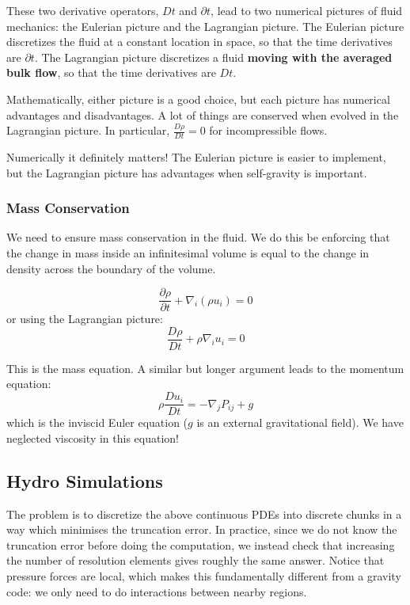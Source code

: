 \documentclass[12pt]{article}
\begin{document}
These two derivative operators, $Dt$ and $\partial t$, lead to two numerical pictures of fluid mechanics: the Eulerian picture and the Lagrangian picture. The Eulerian picture discretizes the fluid at a constant location in space, so that the time derivatives are $\partial t$. The Lagrangian picture discretizes a fluid \textbf{moving with the averaged bulk flow}, so that the time derivatives are $D t$.

Mathematically, either picture is a good choice, but each picture has numerical advantages and disadvantages. A lot of things are conserved when evolved in the Lagrangian picture. In particular, $\frac{D \rho}{D t} = 0$ for incompressible flows.

Numerically it definitely matters! The Eulerian picture is easier to implement, but the Lagrangian picture has advantages when self-gravity is important.

\subsubsection{Mass Conservation}

We need to ensure mass conservation in the fluid. We do this be enforcing that the change in mass inside an infinitesimal volume is equal to the change in density across the boundary of the volume.

\begin{equation}
 \frac{\partial \rho}{\partial t} + \nabla_i (\rho u_i) = 0
\end{equation}
or using the Lagrangian picture:
\begin{equation}
 \frac{D \rho}{D t} + \rho \nabla_i u_i = 0
\end{equation}

This is the mass equation. A similar but longer argument leads to the momentum equation:
\begin{equation}
\rho \frac{D u_i}{D t} = - \nabla_j P_{i j} + g
\end{equation}
which is the inviscid Euler equation ($g$ is an external gravitational field). We have neglected viscosity in this equation!

\subsection{Hydro Simulations}

The problem is to discretize the above continuous PDEs into discrete chunks in a way which minimises the truncation error. In practice, since we do not know the truncation error before doing the computation, we instead check that increasing the number of resolution elements gives roughly the same answer. Notice that pressure forces are local, which makes this fundamentally different from a gravity code: we only need to do interactions between nearby regions.
\end{document}
